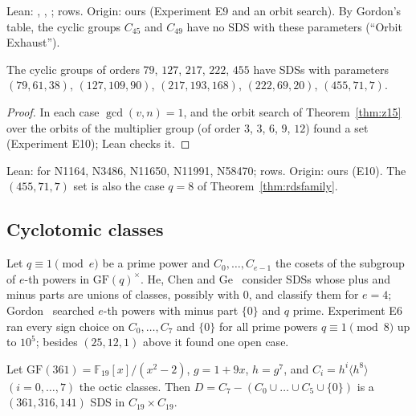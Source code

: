 \begin{remark}
Lean: , , ;
 rows. Origin: ours (Experiment E9 and an orbit search). By Gordon's table, the cyclic
groups $C_{45}$ and $C_{49}$ have no SDS with these parameters (``Orbit Exhaust'').
\end{remark}

\begin{theorem}\label{thm:z20}
The cyclic groups of orders $79$, $127$, $217$, $222$, $455$ have SDSs with parameters
$(79, 61, 38)$, $(127, 109, 90)$, $(217, 193, 168)$, $(222, 69, 20)$, $(455, 71, 7)$.
\end{theorem}

\begin{proof}
In each case $\gcd(v, n) = 1$, and the orbit search of Theorem~\ref{thm:z15} over the orbits
of the multiplier group (of order $3$, $3$, $6$, $9$, $12$) found a set (Experiment E10);
Lean checks it.
\end{proof}

\begin{remark}
Lean:  for N1164, N3486, N11650, N11991, N58470;  rows.
Origin: ours (E10). The $(455, 71, 7)$ set is also the case $q = 8$ of
Theorem~\ref{thm:rdsfamily}.
\end{remark}

\subsection{Cyclotomic classes}

Let $q \equiv 1 \pmod e$ be a prime power and $C_0, \dots, C_{e-1}$ the cosets of the subgroup
of $e$-th powers in $\mathrm{GF}(q)^\times$. He, Chen and Ge~\cite[\S5]{he-chen-ge} consider
SDSs whose plus and minus parts are unions of classes, possibly with $0$, and classify them for
$e = 4$; Gordon~\cite[\S3]{gordon} searched $e$-th powers with minus part $\{0\}$ and $q$
prime. Experiment E6 ran every sign choice on $C_0, \dots, C_7$ and $\{0\}$ for all prime powers
$q \equiv 1 \pmod 8$ up to $10^5$; besides $(25, 12, 1)$ above it found one open case.

\begin{theorem}\label{thm:z7}
Let $\mathrm{GF}(361) = \mathbb{F}_{19}[x]/(x^2 - 2)$, $g = 1 + 9x$, $h = g^7$, and
$C_i = h^i\langle h^8\rangle$ $(i = 0, \dots, 7)$ the octic classes. Then
$D = C_7 - (C_0 \cup \dots \cup C_5 \cup \{0\})$ is a $(361, 316, 141)$ SDS in
$C_{19} \times C_{19}$.
\end{theorem}

